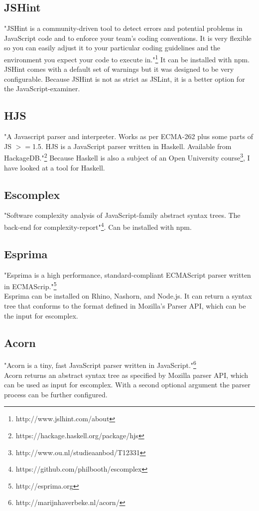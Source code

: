 \documentclass{article}
\begin{document}
\subsection{JSHint}
"JSHint is a community-driven tool to detect errors and potential problems in JavaScript code and to enforce your team's coding conventions. It is very flexible so you can easily adjust it to your particular coding guidelines and the environment you expect your code to execute in."\footnote{http://www.jslhint.com/about}
It can be installed with npm.
JSHint comes with a default set of warnings but it was designed to be very configurable.
Because JSHint is not as strict as JSLint, it is a better option for the JavaScript-examiner.

\subsection{HJS}
"A Javascript parser and interpreter. Works as per ECMA-262 plus some parts of JS $>=$1.5.
HJS is a JavaScript parser written in Haskell. Available from HackageDB."\footnote{https://hackage.haskell.org/package/hjs}
Because Haskell is also a subject of an Open University course\footnote{http://www.ou.nl/studieaanbod/T12331}, I have looked at a tool for Haskell.

\subsection{Escomplex}
"Software complexity analysis of JavaScript-family abstract syntax trees. The back-end for complexity-report"\footnote{https://github.com/philbooth/escomplex}.
Can be installed with npm.

\subsection{Esprima}
"Esprima is a high performance, standard-compliant ECMAScript parser written in ECMAScrip."\footnote{http://esprima.org}\\
Esprima can be installed on Rhino, Nashorn, and Node.js.
It can return a syntax tree that conforms to the format defined in Mozilla's Parser API, which can be the input for escomplex.

\subsection{Acorn}
"Acorn is a tiny, fast JavaScript parser written in JavaScript."\footnote{http://marijnhaverbeke.nl/acorn/}\\
Acorn returns an abstract syntax tree as specified by Mozilla parser API, which can be used as input for escomplex.
With a second optional argument the parser process can be further configured.
\end{document}
